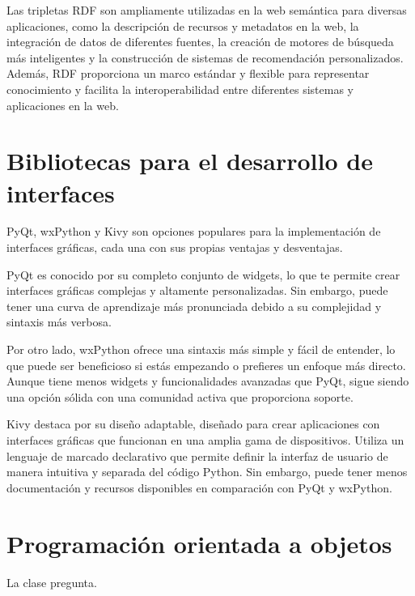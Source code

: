 Las tripletas RDF son ampliamente utilizadas en la web semántica para diversas aplicaciones, como la descripción de recursos y metadatos en la web, la integración de datos de diferentes fuentes, la creación de motores de búsqueda más inteligentes y la construcción de sistemas de recomendación personalizados. Además, RDF proporciona un marco estándar y flexible para representar conocimiento y facilita la interoperabilidad entre diferentes sistemas y aplicaciones en la web.

\section{Bibliotecas para el desarrollo de interfaces}

PyQt, wxPython y Kivy son opciones populares para la implementación de interfaces gráficas, cada una con sus propias ventajas y desventajas.

PyQt es conocido por su completo conjunto de widgets, lo que te permite crear interfaces gráficas complejas y altamente personalizadas. Sin embargo, puede tener una curva de aprendizaje más pronunciada debido a su complejidad y sintaxis más verbosa.

Por otro lado, wxPython ofrece una sintaxis más simple y fácil de entender, lo que puede ser beneficioso si estás empezando o prefieres un enfoque más directo. Aunque tiene menos widgets y funcionalidades avanzadas que PyQt, sigue siendo una opción sólida con una comunidad activa que proporciona soporte.

Kivy destaca por su diseño adaptable, diseñado para crear aplicaciones con interfaces gráficas que funcionan en una amplia gama de dispositivos. Utiliza un lenguaje de marcado declarativo que permite definir la interfaz de usuario de manera intuitiva y separada del código Python. Sin embargo, puede tener menos documentación y recursos disponibles en comparación con PyQt y wxPython.

\section{Programación orientada a objetos}
La clase pregunta.



 




